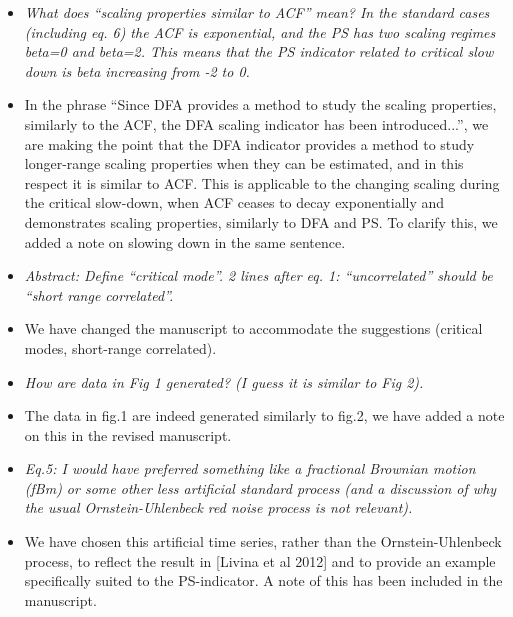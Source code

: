 \documentclass[12pt]{article}
\def\bb{\begin{color}{blue}}
\def\eb{\end{color}\ }
\begin{document}
\begin{itemize}
We have added this text into the manuscript. 


\item[\bf Comment 5.] 
{\sl 
What does ``scaling properties similar to ACF'' mean? 
In the standard cases (including eq. 6) the ACF is exponential, 
and the PS has two scaling regimes beta=0 and beta=2. This means 
that the PS indicator related to critical slow down is beta 
increasing from -2 to 0.
}

\item[\bf Response.]
In the phrase ``Since DFA provides a method to study the 
scaling properties, similarly to the ACF, the DFA scaling indicator 
has been introduced...'', we are making the point that the DFA 
indicator provides a method to study longer-range 
scaling properties when they can be estimated, and 
in this respect it is similar to ACF. This is applicable to 
the changing scaling during the critical slow-down, when 
ACF ceases to decay exponentially and demonstrates scaling properties,
similarly to DFA and PS. To clarify this, we added a note on 
slowing down in the same sentence. 

\item[\bf Comment 6.] %
{\sl 
Abstract: Define ``critical mode''. 2 lines after eq. 1: 
``uncorrelated'' should be ``short range correlated''. 
}

\item[\bf Response.]
We have changed the manuscript to accommodate the suggestions 
(critical modes, short-range correlated).

\item[\bf Comment 7.]
{\sl 
How are data in Fig 1 generated? (I guess it is similar to Fig 2).
}

\item[\bf Response.]
The data in fig.1 are indeed generated similarly to fig.2, 
we have added a note on this in the revised manuscript.

\item[\bf Comment 8.]
{\sl 
Eq.5: I would have preferred something like a fractional 
Brownian motion (fBm) or some other less artificial standard process 
(and a discussion of why the usual Ornstein-Uhlenbeck red noise process 
is not relevant).
}

\item[\bf Response.]
We have chosen this artificial time series, rather than the 
Ornstein-Uhlenbeck process, to reflect the result in 
[Livina et al 2012] 
and to provide an example specifically suited to the PS-indicator. 
A note of this has been included in the manuscript.


\end{itemize}
\end{document}
